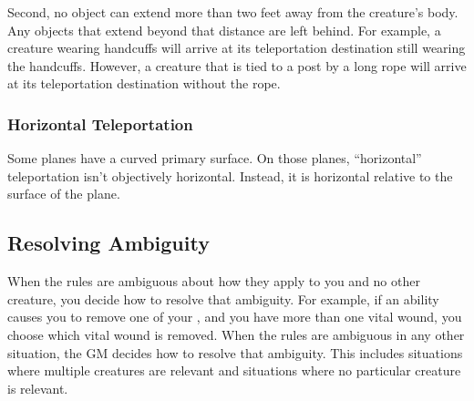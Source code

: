             Second, no object can extend more than two feet away from the creature's body.
            Any objects that extend beyond that distance are left behind.
            For example, a creature wearing handcuffs will arrive at its teleportation destination still wearing the handcuffs.
            However, a creature that is tied to a post by a long rope will arrive at its teleportation destination without the rope.

        \subsubsection{Horizontal Teleportation}
            Some planes have a curved primary surface.
            On those planes, ``horizontal'' teleportation isn't objectively horizontal.
            Instead, it is horizontal relative to the surface of the plane.

    \subsection{Resolving Ambiguity}\label{Resolving Ambiguity}
        When the rules are ambiguous about how they apply to you and no other creature, you decide how to resolve that ambiguity.
        For example, if an ability causes you to remove one of your , and you have more than one vital wound, you choose which vital wound is removed.
        When the rules are ambiguous in any other situation, the GM decides how to resolve that ambiguity.
        This includes situations where multiple creatures are relevant and situations where no particular creature is relevant.
